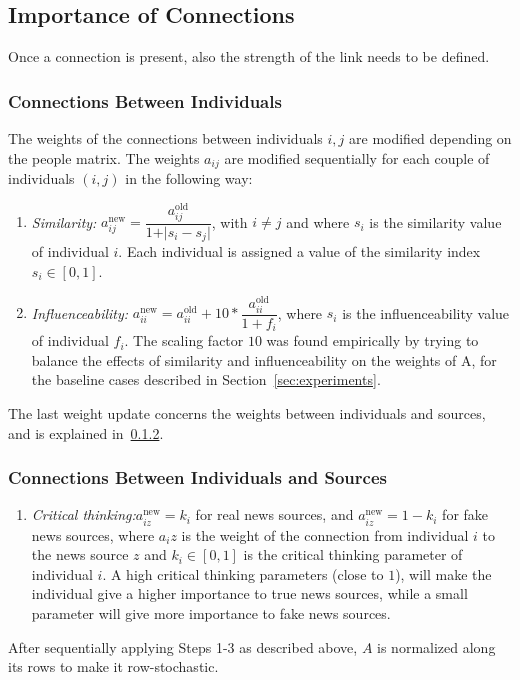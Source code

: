 \subsection{Importance of Connections}
Once a connection is present, also the strength of the link needs to be defined.

\subsubsection{Connections Between Individuals}
The weights of the connections between individuals $i,j$ are modified depending on the people matrix. The weights $a_{ij}$ are modified sequentially for each couple of individuals $(i,j)$ in the following way:

\begin{enumerate}
\item[\text{Step 1}] \textit{Similarity:} $a_{ij}^{\text{new}} = \dfrac{a_{ij}^{\text{old}}}{1 + \vert s_i - s_j\vert}$, with $ i \neq j$ and where $s_i$ is the similarity value of individual $i$. Each individual is assigned a value of the similarity index $s_i \in [0,1]$. 
\item[\text{Step 2}] \textit{Influenceability:} $a_{ii}^{\text{new}} = a_{ii}^{\text{old}}+10*\dfrac{a_{ii}^{\text{old}}}{1 + f_i}$, where $s_i$ is the influenceability value of individual $f_i$. The scaling factor $10$ was found empirically by trying to balance the effects of similarity and influenceability on the weights of A, for the baseline cases described in Section~\ref{sec:experiments}.
\end{enumerate}
The last weight update concerns the weights between individuals and sources, and is explained in~\ref{subsub:ind_sources}.


\subsubsection{Connections Between Individuals and Sources}
\label{subsub:ind_sources}
\begin{enumerate}
\item[\text{Step 3}] \textit{Critical thinking:}$a_{iz}^{\text{new}} = k_i$ for real news sources, and $a_{iz}^{\text{new}} = 1 - k_i$ for fake news sources, where $a_iz$ is the weight of the connection from individual $i$ to the news source $z$ and $k_i \in [0,1]$ is the critical thinking parameter of individual $i$. A high critical thinking parameters (close to $1$), will make the individual give a higher importance to true news sources, while a small parameter will give more importance to fake news sources.
\end{enumerate}
After sequentially applying Steps 1-3 as described above, $A$ is normalized along its rows to make it row-stochastic.